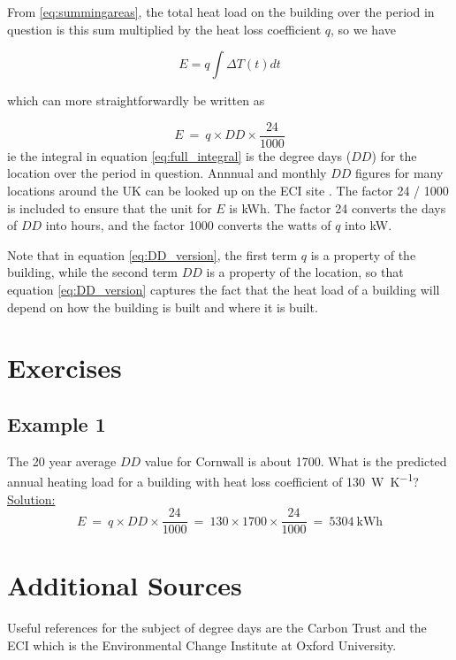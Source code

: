 \documentclass[parskip=half]{scrartcl}
\begin{document}
From \eqref{eq:summingareas}, the total heat load on the building over the period in question is this sum multiplied by the heat loss coefficient $q$, so we have 

\begin{equation}
E=q\int{\Delta T(t) dt}
\label{eq:full_integral}
\end{equation}
 
which can more straightforwardly be written as

\begin{equation}
E\ =\ q\times DD\times\frac{24}{1000}
\label{eq:DD_version}
\end{equation} 
ie the integral in equation \eqref{eq:full_integral} is the degree days ($DD$) for the location over the period in question. Annnual and monthly $DD$ figures for many locations around the UK can be looked up on the ECI site \cite{ECIOxfordUniversity2014}. The factor 24 / 1000 is included to ensure that the unit for $E$ is kWh. The factor 24 converts the days of $DD$ into hours, and the factor 1000 converts the watts of $q$ into kW.

Note that in equation \eqref{eq:DD_version}, the first term $q$ is a property of the building, while the second term $DD$ is a property of the location, so that equation \eqref{eq:DD_version} captures the fact that the heat load of a building will depend on how the building is built and where it is built.

\section{Exercises}
\subsection{Example 1}


The 20 year average $DD$ value for Cornwall is about 1700. What is the predicted annual heating load for a building with heat loss coefficient of \SI{130}{\watt\per\kelvin}?\\
 
\underline{Solution:} $$E\ =\ q\times DD\times\frac{24}{1000}\ =\ 130\times 1700\times \frac{24}{1000}\ =\ 5304\ \text{kWh}$$


\section{Additional Sources}

Useful references for the subject of degree days are the Carbon Trust \cite{CarbonTrust2012} and the ECI \cite{ECIOxfordUniversity2014} which is the Environmental Change Institute at Oxford University.

 

 \printbibliography

 
\end{document}
